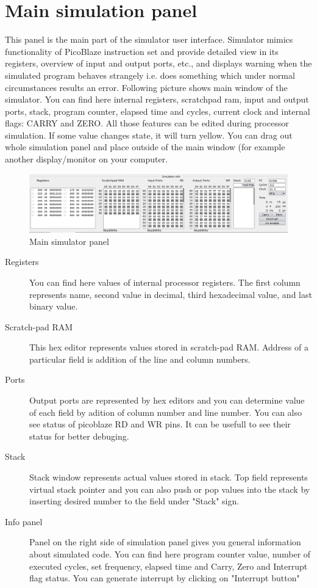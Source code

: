 
\section{Main simulation panel}
    This panel is the main part of the simulator user interface. Simulator mimics functionality of PicoBlaze instruction
    set and provide detailed view in its registers, overview of input and output ports, etc., and displays warning when
    the simulated program behaves strangely i.e. does something which under normal circumstances results an error.
    Following picture shows main window of the simulator. You can find here internal registers, scratchpad ram, input
    and output ports, stack, program counter, elapsed time and cycles, current clock and internal flags: CARRY and ZERO.
    All those features can be edited during processor simulation. If some value changes state, it will turn yellow. You
    can drag out whole simulation panel and place outside of the main window (for example another display/monitor on
    your computer.

   \begin{figure}[h!]
        \centering
        \includegraphics[width=\textwidth]{img/bottom_panel.png}
        \caption{Main simulator panel}
    \end{figure}

    \begin{description}
        \item [Registers]
            You can find here values of internal processor registers. The first column represents name, second value in
            decimal, third hexadecimal value, and last binary value.
        \item [Scratch-pad RAM] This hex editor represents values stored in scratch-pad RAM. Address of a particular field
        is addition of the line and column numbers.
        \item [Ports] Output ports are represented by hex editors and you can determine value of each field by adition of column number and line number.
        You can also see status of picoblaze RD and WR pins. It can be usefull to see their status for better debuging.
        \item [Stack] Stack window represents actual values stored in stack. Top field represents virtual stack pointer and you can also push or pop values into the stack
        by inserting desired number to the field under "Stack" sign.
        \item [Info panel] Panel on the right side of simulation panel gives you general information about simulated code. You can find here program counter
        value, number of executed cycles, set  frequency, elapsed time and Carry, Zero and Interrupt flag status. You can generate interrupt by clicking on "Interrupt button"
    \end{description}

